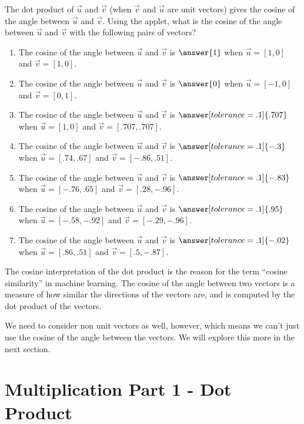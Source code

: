 \documentclass{ximera}
\begin{document}
\begin{problem}
The dot product of $\vec{u}$ and $\vec{v}$ (when $\vec{v}$  and $\vec{u}$ are unit vectors) gives the cosine of the angle between $\vec{u}$ and $\vec{v}$.
Using the applet, what is the cosine of the angle between $\vec{u}$ and $\vec{v}$ with the following pairs of vectors?
\begin{enumerate}
\item The cosine of the angle between $\vec{u}$ and $\vec{v}$ is $\answer{1}$ when $\vec{u}=[1,0]$ and $\vec{v}=[1,0]$.
\item The cosine of the angle between $\vec{u}$ and $\vec{v}$ is $\answer{0}$ when $\vec{u}=[-1,0]$ and $\vec{v}=[0,1]$.
\item The cosine of the angle between $\vec{u}$ and $\vec{v}$ is $\answer[tolerance=.1]{.707}$ when $\vec{u}=[1,0]$ and $\vec{v}=[.707,.707]$.
\item The cosine of the angle between $\vec{u}$ and $\vec{v}$ is $\answer[tolerance=.1]{-.3}$ when $\vec{u}=[.74,.67]$ and $\vec{v}=[-.86,.51]$.
\item The cosine of the angle between $\vec{u}$ and $\vec{v}$ is $\answer[tolerance=.1]{-.83}$ when $\vec{u}=[-.76,.65]$ and $\vec{v}=[.28,-.96]$.
\item The cosine of the angle between $\vec{u}$ and $\vec{v}$ is $\answer[tolerance=.1]{.95}$ when $\vec{u}=[-.58,-.92]$ and $\vec{v}=[-.29,-.96]$.
\item The cosine of the angle between $\vec{u}$ and $\vec{v}$ is $\answer[tolerance=.1]{-.02}$ when $\vec{u}=[.86,.51]$ and $\vec{v}=[.5,-.87]$.
\end{enumerate}
\end{problem}

\begin{remark}
    The cosine interpretation of the dot product is the reason for the term ``cosine similarity'' in machine learning. The cosine of the angle between two vectors is a measure of how similar the directions of the vectors are, and is computed by the dot product of the vectors.

    We need to consider non unit vectors as well, however, which means we can't just use the cosine of the angle between the vectors. We will explore this more in the next section.
\end{remark}

\section*{Multiplication Part 1 - Dot Product}
\end{document}
